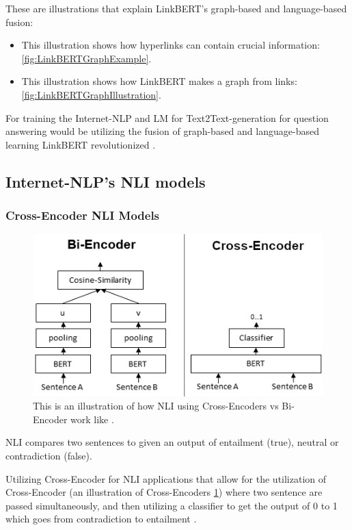These are illustrations that explain LinkBERT's graph-based and language-based fusion:

\begin{itemize}[leftmargin=1em]
    \item This illustration shows how hyperlinks can contain crucial information: \ref{fig:LinkBERTGraphExample}.
    \item This illustration shows how LinkBERT \cite{https://doi.org/10.48550/arxiv.2203.15827} makes a graph from links: \ref{fig:LinkBERTGraphIllustration}.
\end{itemize}

For training the Internet-NLP and LM for Text2Text-generation for question answering would be utilizing the fusion of graph-based and language-based learning LinkBERT revolutionized \cite{https://doi.org/10.48550/arxiv.2203.15827}.

\subsection{Internet-NLP's NLI models}

\subsubsection{Cross-Encoder NLI Models}

\begin{figure}
    \includegraphics[width=1.0\columnwidth]{Bi_vs_Cross-Encoder.png}
    \caption{This is an illustration of how NLI using Cross-Encoders vs Bi-Encoder work like \cite{thakur-2020-AugSBERT}.}
    \label{fig:CrossEncoderNLI}
\end{figure}

NLI compares two sentences to given an output of entailment (true), neutral or contradiction (false).

Utilizing Cross-Encoder for NLI applications that allow for the utilization of Cross-Encoder (an illustration of Cross-Encoders \ref{fig:CrossEncoderNLI}) where two sentence are passed simultaneously, and then utilizing a classifier to get the output of 0 to 1 which goes from contradiction to entailment \cite{thakur-2020-AugSBERT, https://doi.org/10.48550/arxiv.1908.10084}.
